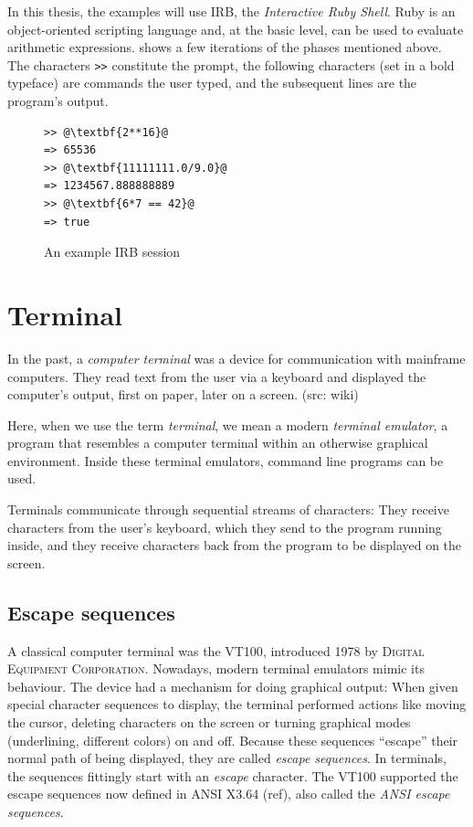 \documentclass[paper=a4,twoside,abstract=on,cleardoublepage=empty,numbers=noenddot,toc=bib,12pt,appendixprefix=true]{scrreprt}
\begin{document}
In this thesis, the examples will use IRB, the \emph{Interactive Ruby Shell}. Ruby is an object-oriented scripting language and, at the basic level, can be used to evaluate arithmetic expressions.  shows a few iterations of the phases mentioned above. The characters \texttt{>\->} constitute the prompt, the following characters (set in a bold typeface) are commands the user typed, and the subsequent lines are the program's output.

\begin{figure}[tb]
    \begin{lstlisting}[escapechar=@]
>> @\textbf{2**16}@
=> 65536
>> @\textbf{11111111.0/9.0}@
=> 1234567.888888889
>> @\textbf{6*7 == 42}@
=> true
    \end{lstlisting}
    \centering
    \caption{An example IRB session}
    \label{fig:irb}
\end{figure}

\section{Terminal}

In the past, a \emph{computer terminal} was a device for communication with mainframe computers. They read text from the user via a keyboard and displayed the computer's output, first on paper, later on a screen. (src: wiki)

Here, when we use the term \emph{terminal}, we mean a modern \emph{terminal emulator}, a program that resembles a computer terminal within an otherwise graphical environment. Inside these terminal emulators, command line programs can be used.

Terminals communicate through sequential streams of characters: They receive characters from the user's keyboard, which they send to the program running inside, and they receive characters back from the program to be displayed on the screen.

\subsection{Escape sequences}

A classical computer terminal was the \textsc{VT100}, introduced 1978 by \textsc{Digital Equipment Corporation}. Nowadays, modern terminal emulators mimic its behaviour. The device had a mechanism for doing graphical output: When given special character sequences to display, the terminal performed actions like moving the cursor, deleting characters on the screen or turning graphical modes (underlining, different colors) on and off. Because these sequences “escape” their normal path of being displayed, they are called \emph{escape sequences}. In terminals, the sequences fittingly start with an \emph{escape} character. The \textsc{VT100} supported the escape sequences now defined in ANSI X3.64 (ref), also called the \emph{ANSI escape sequences}.
\end{document}
